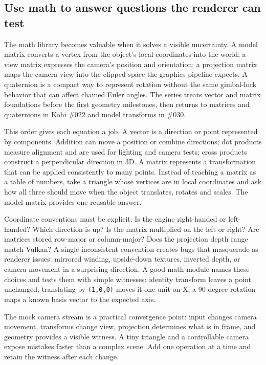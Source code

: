 \subsection{Use math to answer questions the renderer can test}\label{06-engine-ii-ch026-use-math-to-answer-questions-the-renderer-can-test}

The math library becomes valuable when it solves a visible uncertainty. A model matrix converts a vertex from the object's local coordinates into the world; a view matrix expresses the camera's position and orientation; a projection matrix maps the camera view into the clipped space the graphics pipeline expects. A quaternion is a compact way to represent rotation without the same gimbal-lock behavior that can affect chained Euler angles. The series treats vector and matrix foundations before the first geometry milestones, then returns to matrices and quaternions in \href{https://www.youtube.com/watch?v=nk3KNPrSRqc}{Kohi \#022} and model transforms in \href{https://www.youtube.com/watch?v=xGonaV-OB7E}{\#030}.

This order gives each equation a job. A vector is a direction or point represented by components. Addition can move a position or combine directions; dot products measure alignment and are used for lighting and camera tests; cross products construct a perpendicular direction in 3D. A matrix represents a transformation that can be applied consistently to many points. Instead of teaching a matrix as a table of numbers, take a triangle whose vertices are in local coordinates and ask how all three should move when the object translates, rotates and scales. The model matrix provides one reusable answer.

Coordinate conventions must be explicit. Is the engine right-handed or left-handed? Which direction is up? Is the matrix multiplied on the left or right? Are matrices stored row-major or column-major? Does the projection depth range match Vulkan? A single inconsistent convention creates bugs that masquerade as renderer issues: mirrored winding, upside-down textures, inverted depth, or camera movement in a surprising direction. A good math module names these choices and tests them with simple witnesses: identity transform leaves a point unchanged; translating by \texttt{(1,0,0)} moves it one unit on X; a 90-degree rotation maps a known basis vector to the expected axis.

The mock camera stream is a practical convergence point: input changes camera movement, transforms change view, projection determines what is in frame, and geometry provides a visible witness. A tiny triangle and a controllable camera expose mistakes faster than a complex scene. Add one operation at a time and retain the witness after each change.

